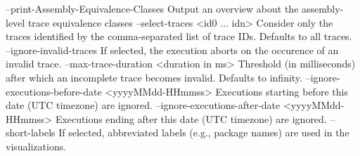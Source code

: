     --print-Assembly-Equivalence-Classes                Output an overview about
                                                        the assembly-level trace
                                                        equivalence classes
    --select-traces <id0 ... idn>                       Consider only the traces
                                                        identified by the
                                                        comma-separated list of
                                                        trace IDs. Defaults to
                                                        all traces.
    --ignore-invalid-traces                             If selected, the
                                                        execution aborts on the
                                                        occurence of an invalid
                                                        trace.
    --max-trace-duration <duration in ms>               Threshold (in
                                                        milliseconds) after
                                                        which an incomplete
                                                        trace becomes invalid.
                                                        Defaults to infinity.
    --ignore-executions-before-date <yyyyMMdd-HHmmss>   Executions starting
                                                        before this date (UTC
                                                        timezone) are ignored.
    --ignore-executions-after-date <yyyyMMdd-HHmmss>    Executions ending after
                                                        this date (UTC timezone)
                                                        are ignored.
    --short-labels                                      If selected, abbreviated
                                                        labels (e.g., package
                                                        names) are used in the
                                                        visualizations.
